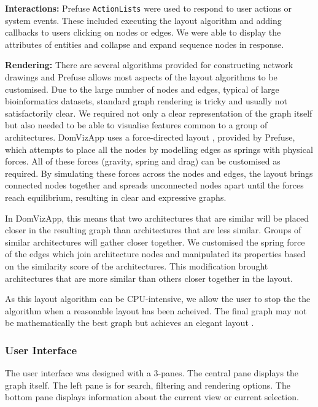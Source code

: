 \textbf{Interactions:} Prefuse \texttt{ActionLists} were used to respond to user actions or system events. These included executing the layout algorithm and adding callbacks to users clicking on nodes or edges. We were able to display the attributes of entities and collapse and expand sequence nodes in response.

\textbf{Rendering:} There are several algorithms provided for constructing network drawings and Prefuse allows most aspects of the layout algorithms to be customised. Due to the large number of nodes and edges, typical of large bioinformatics datasets, standard graph rendering is tricky and usually not satisfactorily clear. We required not only a clear representation of the graph itself but also needed to be able to visualise features common to a group of architectures. DomVizApp uses a force-directed layout \cite{force}, provided by Prefuse, which attempts to place all the nodes by modelling edges as springs with physical forces. All of these forces (gravity, spring and drag) can be customised as required. By simulating these forces across the nodes and edges, the layout brings connected nodes together and spreads unconnected nodes apart until the forces reach equilibrium, resulting in clear and expressive graphs. 

In DomVizApp, this means that two architectures that are similar will be placed closer in the resulting graph than architectures that are less similar. Groups of similar architectures will gather closer together. We customised the spring force of the edges which join architecture nodes and manipulated its properties based on the similarity score of the architectures. This modification brought architectures that are more similar than others closer together in the layout.

As this layout algorithm can be CPU-intensive, we allow the user to stop the the algorithm when a reasonable layout has been acheived. The final graph may not be mathematically the best graph but achieves an elegant layout \cite{force}.

\subsubsection{User Interface}



The user interface was designed with a 3-panes. The central pane displays the graph itself. The left pane is for search, filtering and rendering options. The bottom pane displays information about the current view or current selection.  


